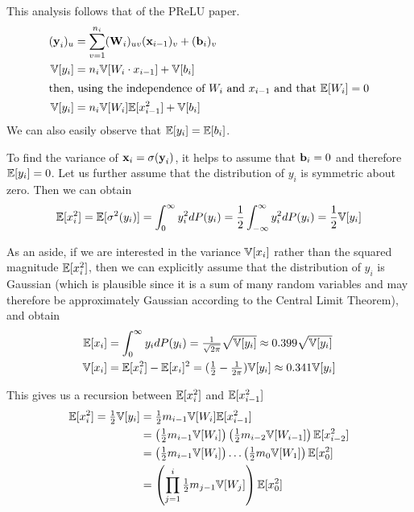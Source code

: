 This analysis follows that of the PReLU paper.
\begin{align}
(\boldsymbol{\mathbf{y}}_{i})_{u} & = \sum_{v = 1}^{n_{i}} (\boldsymbol{\mathbf{W}}_{i})_{u v} (\boldsymbol{\mathbf{x}}_{i - 1})_{v} + (\boldsymbol{\mathbf{b}}_{i})_{v} \\
\mathbb{V}[y_{i}] & = n_{i} \mathbb{V}[W_{i} \cdot x_{i-1}] + \mathbb{V}[b_{i}] \\
\intertext{then, using the independence of $W_{i}$ and $x_{i-1}$ and that $\mathbb{E}[W_{i}] = 0$}
\mathbb{V}[y_{i}] & = n_{i} \mathbb{V}[W_{i}] \mathbb{E}[x_{i-1}^2] + \mathbb{V}[b_{i}]
\end{align}
We can also easily observe that $\mathbb{E}[y_{i}] = \mathbb{E}[b_{i}]$.

To find the variance of $\boldsymbol{\mathbf{x}}_{i} = \sigma(\boldsymbol{\mathbf{y}}_{i})$, it helps to assume that $\boldsymbol{\mathbf{b}}_{i} = 0$ and therefore $\mathbb{E}[y_{i}] = 0$.
Let us further assume that the distribution of $y_{i}$ is symmetric about zero.
Then we can obtain
\begin{align}
\mathbb{E}[x_{i}^2] = \mathbb{E}[\sigma^2(y_{i})] = \int_{0}^{\infty} y_{i}^2 dP(y_{i}) = \frac{1}{2} \int_{-\infty}^{\infty} y_{i}^2 dP(y_{i}) = \frac{1}{2} \mathbb{V}[y_{i}]
\end{align}

As an aside, if we are interested in the variance $\mathbb{V}[x_{i}]$ rather than the squared magnitude $\mathbb{E}[x_{i}^2]$, then we can explicitly assume that the distribution of $y_{i}$ is Gaussian (which is plausible since it is a sum of many random variables and may therefore be approximately Gaussian according to the Central Limit Theorem), and obtain
\begin{align}
\mathbb{E}[x_{i}] & = \int_{0}^{\infty} y_{i} dP(y_{i}) = \tfrac{1}{\sqrt{2 \pi}} \sqrt{\mathbb{V}[y_{i}]} \approx 0.399 \sqrt{\mathbb{V}[y_{i}]} \\
\mathbb{V}[x_{i}] & = \mathbb{E}[x_{i}^2] - \mathbb{E}[x_{i}]^2 = (\tfrac{1}{2} - \tfrac{1}{2 \pi}) \mathbb{V}[y_{i}] \approx 0.341 \mathbb{V}[y_{i}]
\end{align}

This gives us a recursion between $\mathbb{E}[x_{i}^2]$ and $\mathbb{E}[x_{i - 1}^2]$
\begin{align}
\mathbb{E}[x_{i}^2] = \tfrac{1}{2} \mathbb{V}[y_{i}] & = \tfrac{1}{2} m_{i - 1} \mathbb{V}[W_{i}] \mathbb{E}[x_{i - 1}^2] \\
& = \left(\tfrac{1}{2} m_{i - 1} \mathbb{V}[W_{i}]\right) \left(\tfrac{1}{2} m_{i-2} \mathbb{V}[W_{i-1}]\right) \mathbb{E}[x_{i-2}^2] \\
& = \left(\tfrac{1}{2} m_{i - 1} \mathbb{V}[W_{i}]\right) \dots \left(\tfrac{1}{2} m_{0} \mathbb{V}[W_{1}]\right) \mathbb{E}[x_{0}^2] \\
& = \left( \prod_{j = 1}^{i} \tfrac{1}{2} m_{j - 1} \mathbb{V}[W_{j}] \right) \mathbb{E}[x_{0}^2]
\end{align}

